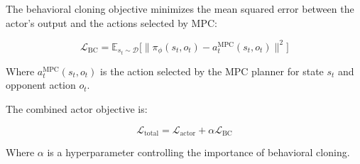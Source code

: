 The behavioral cloning objective minimizes the mean squared error between the actor's output and the actions selected by MPC:

\begin{equation}
\mathcal{L}_{\text{BC}} = \mathbb{E}_{s_t \sim \mathcal{D}}\Big[\|\pi_\phi(s_t, o_t) - a_t^{\text{MPC}}(s_t, o_t)\|^2\Big]
\end{equation}

Where $a_t^{\text{MPC}}(s_t, o_t)$ is the action selected by the MPC planner for state $s_t$ and opponent action $o_t$.

The combined actor objective is:

\begin{equation}
\mathcal{L}_{\text{total}} = \mathcal{L}_{\text{actor}} + \alpha \mathcal{L}_{\text{BC}}
\end{equation}

Where $\alpha$ is a hyperparameter controlling the importance of behavioral cloning.
